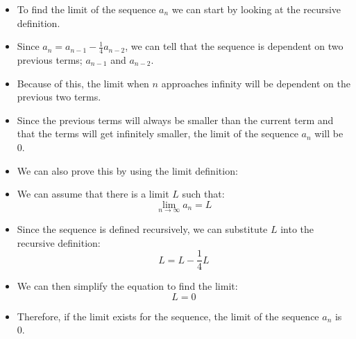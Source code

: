 \documentclass[12pt]{report}
\begin{document}
\begin{enumerate}[leftmargin=\labelsep]
\begin{enumerate}
                \begin{tcolorbox}
                    \begin{itemize}[label={}]
                        \item To find the limit of the sequence $a_n$ we can start by looking at the recursive definition.
                        \item Since $a_n = a_{n-1} - \frac{1}{4}a_{n-2}$, we can tell that the sequence is dependent on two previous terms; $a_{n-1}$ and $a_{n-2}$.
                        \item Because of this, the limit when $n$ approaches infinity will be dependent on the previous two terms.
                        \item Since the previous terms will always be smaller than the current term and that the terms will get infinitely smaller, the limit of the sequence $a_n$ will be 0.
                    \end{itemize}
                    \begin{itemize}[label={}]
                        \item We can also prove this by using the limit definition:
                        \item We can assume that there is a limit $L$ such that:
                        \begin{equation*}
                            \lim \limits_{n\rightarrow \infty} a_n = L
                        \end{equation*}
                        \item Since the sequence is defined recursively, we can substitute $L$ into the recursive definition:
                        \begin{equation*}
                            L=L-\frac{1}{4}L
                        \end{equation*}
                        \item We can then simplify the equation to find the limit:
                        \begin{equation*}
                            L=0
                        \end{equation*}
                        \item Therefore, if the limit exists for the sequence, the limit of the sequence $a_n$ is 0.
                    \end{itemize}
                \end{tcolorbox}
        \end{enumerate}


\end{enumerate}
\end{document}
